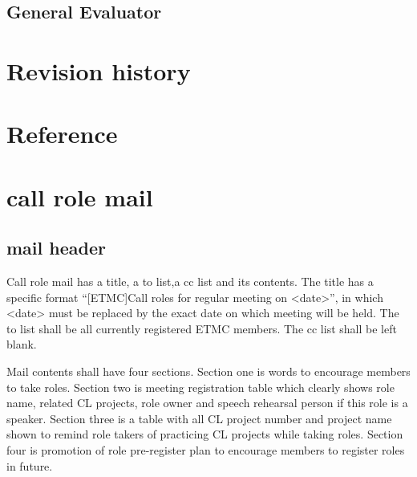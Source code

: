 \subsection{General Evaluator}

\section{Revision history}
\section{Reference}

\section{call role mail}
\subsection{mail header}
Call role mail has a title, a to list,a cc list and its contents. The title has a specific 
format ``[ETMC]Call roles for regular meeting on <date>'', in which <date> must be replaced
by the exact date on which meeting will be held. The to list shall be all currently registered 
ETMC members. The cc list shall be left blank.

Mail contents shall have four sections. Section one is words to encourage members to 
take roles. Section two is meeting registration table which clearly shows role name, related 
CL projects, role owner and speech rehearsal person if this role is a speaker. Section three 
is a table with all CL project number and project name shown to remind role takers of practicing
CL projects while taking roles. Section four is promotion of role pre-register plan to encourage
members to register roles in future.



\bye
